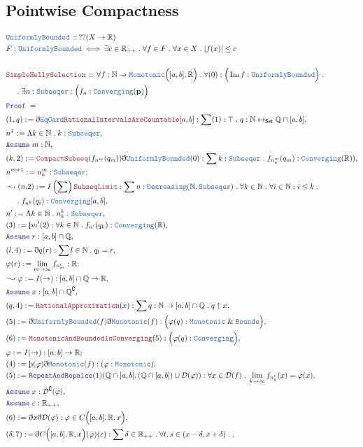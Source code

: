 \documentclass[12pt]{scrartcl}
\newcommand{\TYPE}[1]{\textcolor{NavyBlue}{\mathtt{#1}}}
\newcommand{\LOGIC}[1]{\textcolor{Blue}{\mathtt{#1}}}
\newcommand{\THM}[1]{\textcolor{Maroon}{\mathtt{#1}}}
\renewcommand{\.}{\; . \;}
\newcommand{\de}{: \kern 0.1pc =}
\newcommand{\Theorem}[2]{& \THM{#1} \, :: \, #2 \\ & \Proof = \\ }
\newcommand{\DeclareType}[2]{& \TYPE{#1} \, :: \, #2 \\}
\newcommand{\DefineType}[3]{& #1 : \TYPE{#2} \iff #3 \\}
\newcommand{\NewLine}{\\ & \kern 1pc}
\newcommand{\Page}[1]{ \begin{align*} #1 \end{align*}   }
\newcommand{ \bd }{ \ByDef }
\renewcommand{\And}{\; \& \;}
\newcommand{\Reals}{\mathbb{R} }
\newcommand{\Rats}{\mathbb{Q} }
\newcommand{\Nat}{\mathbb{N} }
\DeclareMathOperator*{\im}{Im}
\newcommand{\ToBij}{\leftrightarrow}
\renewcommand{\c}{\complement}
\newcommand{\Say}[3]{& #1 \de #2 : #3, \\}
\newcommand{\Conclude}[3]{& #1 \de #2 : #3; \\}
\newcommand{\Derive}[3]{& \leadsto #1 \de #2 : #3, \\}
\newcommand{\Assume}[2]{& \LOGIC{Assume} \;#1 : #2, \\}
\newcommand{\ByDef}{\eth}
\newcommand{\ByConstr}{\text{\thorn}}
\newcommand{\Proof}{\LOGIC{Proof} \; }
\begin{document}
\subsection{Pointwise Compactness}
\Page{
	\DeclareType{UniformlyBounded}{ ??(X \to \Reals)}
	\DefineType{F}{UniformlyBounded}{\exists c \in \Reals_{++} \. \forall f \in F \. \forall x \in X \. |f(x)| \le c}
	\\
	\Theorem{SimpleHellySelection}{\forall f : \Nat \to \TYPE{Monotonic}\Big([a,b],\Reals\Big) \. 
		\forall (0) : \Big( \im  f : \TYPE{UniformlyBounded} \Big) \. \NewLine \. \exists n : \TYPE{Subseqer} : 
		\Big( f_n : \TYPE{Converging}(\mathbf{p}) \Big)                                 
	}
	\Say{(1,q)}{\bd \TYPE{EqCard} \THM{RationalIntervalsAreCountable}[a,b]}
	{ \sum (1) : \top \. q :\Nat \ToBij_{\mathsf{Set}} \Rats \cap [a,b]}
	\Say{n^1}{\Lambda k \in \Nat \. k}{\TYPE{Subseqer}}
	\Assume{m}{\Nat}
	\Say{(k,2)}{\THM{CompactSubseq}(f_{n^m}(q_m))\bd \TYPE{UniformlyBounded}(0)}
	{\sum k : \TYPE{Subseqer} \. f_{n_k^m}(q_m) : \TYPE{Converging}(\Reals))}
	\Conclude{n^{m+1}}{n^m_k}{\TYPE{Subseqer}} 
	\Derive{(n.2)}{I\left( \sum \right)\THM{SubseqLimit}}
	{ \sum n :  \TYPE{Decreasing}(\Nat,  \TYPE{Subseqer}) \. \forall k \in \Nat \. \forall i \in \Nat :
		i \le k \.  \NewLine \. f_{n^k}(q_i) : \TYPE{Converging}[a,b]}
	\Say{n'}{\Lambda k \in \Nat \. n^k_k}{ \TYPE{Subseqer}}
	\Say{(3)}{\ByConstr n' (2)}{ \forall k \in \Nat \. f_{n'}(q_k) : \TYPE{Converging}(\Reals) }
	\Assume{r}{[a,b] \cap \Rats}
	\Say{(l,4)}{\bd q(r)}{\sum l \in \Nat \. q_l = r}
	\Conclude{\varphi(r)}{\lim_{m \to \infty} f_{n'_m}}{ \Reals  }
	\Derive{ \varphi  }{I(\to)}{[a,b] \cap \Rats \to \Reals}
	\Assume{x}{[a,b] \cap \Rats^\c}
	\Say{(q,4)}{\THM{RationalApproximation}(x)}{ \sum q : \Nat \to [a,b] \cap \Rats \. q \uparrow x }
	\Say{(5)}{ \bd \TYPE{UniformlyBounded}(f) \bd \TYPE{Monotonic}(f)}
	{\Big( \varphi(q) : \TYPE{Monotonic} \And \TYPE{Bounde}  \Big)}
	\Say{(6)}{\THM{MonotonicAndBoundedIsConverging}(5)}{\Big( \varphi(q) : \TYPE{Converging} \Big)}
	\Conclude{\varphi}{I(\to)}{[a,b] \to \Reals}
	\Say{(4)}{ \ByConstr(\varphi)\bd \TYPE{Monotonic}(f)}{(\varphi : \TYPE{Monotonic})}
	\Say{(5)}{\LOGIC{RepeatAndRepalce}(1)(\Rats \cap [a,b], (\Rats \cap [a, b]) \cup \mathcal{D}(\varphi))}
	{ \forall x \in \mathcal{D}(f) \. \lim_{k \to \infty} f_{n'_k}(x) = \varphi(x)  }
	\Assume{x}{\mathcal{D}^\c(\varphi)}
	\Assume{\varepsilon}{\Reals_{++}}
	\Say{(6)}{\bd x \bd \mathcal{D}(\varphi)}{ \varphi \in C\Big([a,b],\Reals,x\Big) }
	\Say{(\delta,7)}{ \bd C\Big([a,b],\Reals,x\Big)(\varphi)(\varepsilon) }
	{   \sum \delta \in \Reals_{++} \. \forall t,s \in ( x - \delta, x + \delta) \.    
}}
\end{document}
